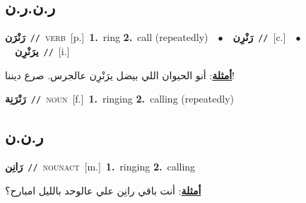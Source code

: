 \documentclass[10pt,a4paper,twoside]{article} %
\begin{document}
\begin{multicols}{2}
\vspace{-3mm}
\subsection*{\color{blue}\foreignlanguage{arabic}{ر.ن.ر.ن}\color{blue}{}} 

{\setlength\topsep{0pt}\textbf{\foreignlanguage{arabic}{رَنْرَن}}\ {\color{gray}\texttt{//}\color{black}}\ \textsc{verb}\ [p.]\ \textbf{1.}~ring  \textbf{2.}~call (repeatedly)\ \ $\bullet$\ \ \setlength\topsep{0pt}\textbf{\foreignlanguage{arabic}{رَنْرِن}}\ {\color{gray}\texttt{//}\color{black}}\ [c.]\ \ $\bullet$\ \ \setlength\topsep{0pt}\textbf{\foreignlanguage{arabic}{يرَنْرِن}}\ {\color{gray}\texttt{//}\color{black}}\ [i.]\  \begin{flushright}\color{gray}\foreignlanguage{arabic}{\textbf{\underline{\foreignlanguage{arabic}{أمثلة}}}: أنو الحيوان اللي بيضل يرَنْرِن عالجرس. صرع ديننا!}\end{flushright}\color{black}} \vspace{2mm}

{\setlength\topsep{0pt}\textbf{\foreignlanguage{arabic}{رَنْرَنِة}}\ {\color{gray}\texttt{//}\color{black}}\ \textsc{noun}\ [f.]\ \textbf{1.}~ringing  \textbf{2.}~calling (repeatedly)\ } \vspace{2mm}

\vspace{-3mm}
\subsection*{\color{blue}\foreignlanguage{arabic}{ر.ن.ن}\color{blue}{}} 

{\setlength\topsep{0pt}\textbf{\foreignlanguage{arabic}{رَانِن}}\ {\color{gray}\texttt{//}\color{black}}\ \textsc{noun\textunderscore act}\ [m.]\ \textbf{1.}~ringing  \textbf{2.}~calling\  \begin{flushright}\color{gray}\foreignlanguage{arabic}{\textbf{\underline{\foreignlanguage{arabic}{أمثلة}}}: أنت باقي رانِن علي عالوحد بالليل امبارح؟}\end{flushright}\color{black}} \vspace{2mm}


\end{multicols}
\end{document}
